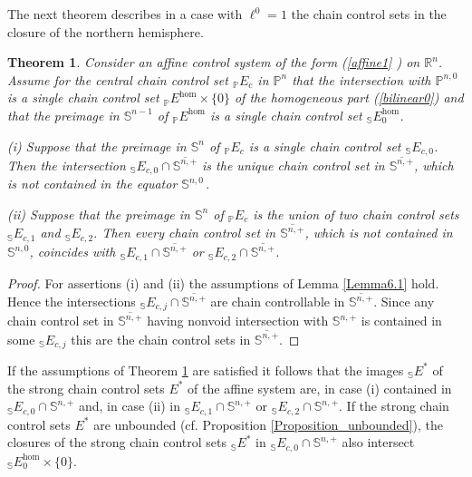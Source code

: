 \documentclass[preprint,12pt]{elsarticle}
\newtheorem{theorem}{Theorem}
\begin{document}
The next theorem describes in a case with $\ell^{0}=1$ the chain control sets
in the closure of the northern hemisphere.

\begin{theorem}
\label{Theorem_S+}Consider an affine control system of the form (\ref{affine1}%
) on $\mathbb{R}^{n}$. Assume for the central chain control set $_{\mathbb{P}%
}E_{c}$ in $\mathbb{P}^{n}$ that the intersection with $\mathbb{P}^{n,0}$ is a
single chain control set $_{\mathbb{P}}E^{\hom}\times\{0\}$ of the homogeneous
part (\ref{bilinear0}) and that the preimage in $\mathbb{S}^{n-1}$ of
$_{\mathbb{P}}E^{\hom}$ is a single chain control set $_{\mathbb{S}}%
E_{0}^{\hom}$.

(i) Suppose that the preimage in $\mathbb{S}^{n}$ of $_{\mathbb{P}}E_{c}$ is a
single chain control set $_{\mathbb{S}}E_{c,0}$. Then the intersection
$_{\mathbb{S}}E_{c,0}\cap\overline{\mathbb{S}^{n,+}}$ is the unique chain
control set in $\overline{\mathbb{S}^{n,+}}$, which is not contained in the
equator $\mathbb{S}^{n,0}\,.$

(ii) Suppose that the preimage in $\mathbb{S}^{n}$ of $_{\mathbb{P}}E_{c}$ is
the union of two chain control sets $_{\mathbb{S}}E_{c,1}$ and $_{\mathbb{S}%
}E_{c,2}$. Then every chain control set in $\overline{\mathbb{S}^{n,+}}$,
which is not contained in $\mathbb{S}^{n,0}$, coincides with $_{\mathbb{S}%
}E_{c,1}\cap\overline{\mathbb{S}^{n,+}}$ or $_{\mathbb{S}}E_{c,2}\cap
\overline{\mathbb{S}^{n,+}}$.
\end{theorem}

\begin{proof}
For assertions (i) and (ii) the assumptions of Lemma \ref{Lemma6.1} hold.
Hence the intersections $_{\mathbb{S}}E_{c,j}\cap\overline{\mathbb{S}^{n,+}}$
are chain controllable in $\overline{\mathbb{S}^{n,+}}$. Since any chain
control set in $\overline{\mathbb{S}^{n,+}}$ having nonvoid intersection with
$\mathbb{S}^{n,+}$ is contained in some $_{\mathbb{S}}E_{c,j}$ this are the
chain control sets in $\overline{\mathbb{S}^{n,+}}$.
\end{proof}

If the assumptions of Theorem \ref{Theorem_S+} are satisfied it follows that
the images $_{\mathbb{S}}E^{\ast}$ of the strong chain control sets $E^{\ast}$
of the affine system are, in case (i) contained in $_{\mathbb{S}}E_{c,0}%
\cap\mathbb{S}^{n,+}$ and, in case (ii) in $_{\mathbb{S}}E_{c,1}\cap
\mathbb{S}^{n,+}$ or $_{\mathbb{S}}E_{c,2}\cap\mathbb{S}^{n,+}$. If the strong
chain control sets $E^{\ast}$ are unbounded (cf. Proposition
\ref{Proposition_unbounded}), the closures of the strong chain control sets
$_{\mathbb{S}}E^{\ast}$ in $_{\mathbb{S}}E_{c,0}\cap\mathbb{S}^{n,+}$ also
intersect $_{\mathbb{S}}E_{0}^{\hom}\times\{0\}$.
\end{document}
